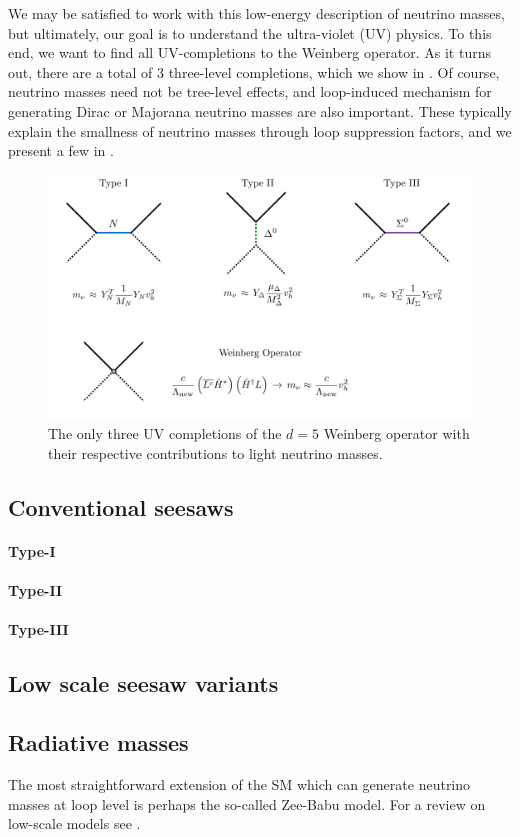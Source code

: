 We may be satisfied to work with this low-energy description of neutrino masses, but ultimately, our goal is to understand the ultra-violet (UV) physics. To this end, we want to find all UV-completions to the Weinberg operator. As it turns out, there are a total of 3 three-level completions, which we show in . Of course, neutrino masses need not be tree-level effects, and loop-induced mechanism for generating Dirac or Majorana neutrino masses are also important. These typically explain the smallness of neutrino masses through loop suppression factors, and we present a few in .
%
\begin{figure}[t]
\centering
\includegraphics[width=\textwidth]{seesaw_mechanisms.pdf}
\caption[The tree-level UV completions of the Weinberg operator.]{The only three UV completions of the $d=5$ Weinberg operator with their respective contributions to light neutrino masses.\label{fig:seesaw_mechanisms}}
\end{figure}

\subsection{Conventional seesaws}

\paragraph{Type-I}
\paragraph{Type-II}
\paragraph{Type-III}


\subsection{Low scale seesaw variants}



\subsection{Radiative masses}\label{sec:radiative}

The most straightforward extension of the SM which can generate neutrino masses at loop level is perhaps the so-called Zee-Babu model. For a review on low-scale models see \cite{Boucenna:2014zba}.
